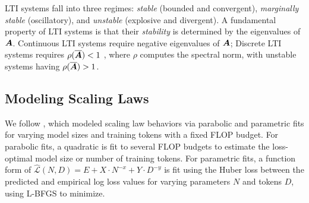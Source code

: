 LTI systems fall into three regimes: \emph{stable} (bounded and convergent), \emph{marginally stable} (oscillatory), and \emph{unstable} (explosive and divergent). 
A fundamental property of LTI systems is that their \emph{stability} is determined by the eigenvalues of $\bm{A}$.
Continuous LTI systems require negative eigenvalues of $\bm{A}$; Discrete LTI systems requires $\rho(\overline{\bm{A}}) < 1$ \citep{1082819}, where $\rho$ computes the spectral norm, with unstable systems having $\rho(\overline{\bm{A}})>1$. 

\subsection{Modeling Scaling Laws} 
\label{sec:scaling-laws-basics}
We follow \citet{hoffmann2022trainingcomputeoptimallargelanguage}, which modeled scaling law behaviors via parabolic and parametric fits for varying model sizes and training tokens with a fixed FLOP budget.
For parabolic fits, a quadratic is fit to several FLOP budgets to estimate the loss-optimal model size or number of training tokens. For parametric fits, a function form of $\widehat{\mathcal{L}}(N,D) = E + X \cdot N^{-x} + Y \cdot D^{-y}$ is fit using the Huber loss \citep{huber} between the predicted and empirical log loss values for varying parameters $N$ and tokens $D$, using L-BFGS \cite{lbfgs} to minimize.



